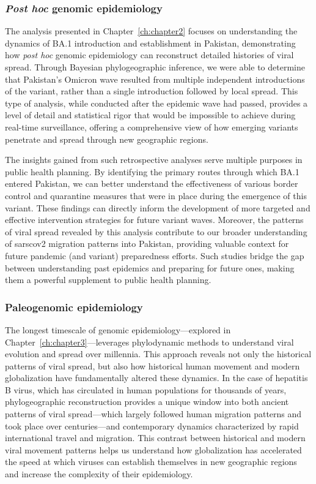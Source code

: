 \subsubsection{\textit{Post hoc} genomic epidemiology}
The analysis presented in Chapter~\ref{ch:chapter2} focuses on understanding the dynamics of BA.1 introduction and establishment in Pakistan, demonstrating how \textit{post hoc} genomic epidemiology can reconstruct detailed histories of viral spread.
Through Bayesian phylogeographic inference, we were able to determine that Pakistan's Omicron wave resulted from multiple independent introductions of the variant, rather than a single introduction followed by local spread.
This type of analysis, while conducted after the epidemic wave had passed, provides a level of detail and statistical rigor that would be impossible to achieve during real-time surveillance, offering a comprehensive view of how emerging variants penetrate and spread through new geographic regions.

The insights gained from such retrospective analyses serve multiple purposes in public health planning.
By identifying the primary routes through which BA.1 entered Pakistan, we can better understand the effectiveness of various border control and quarantine measures that were in place during the emergence of this variant.
These findings can directly inform the development of more targeted and effective intervention strategies for future variant waves.
Moreover, the patterns of viral spread revealed by this analysis contribute to our broader understanding of \gls{sarscov2} migration patterns into Pakistan, providing valuable context for future pandemic (and variant) preparedness efforts.
Such studies bridge the gap between understanding past epidemics and preparing for future ones, making them a powerful supplement to public health planning.

\subsubsection{Paleogenomic epidemiology}
The longest timescale of genomic epidemiology---explored in Chapter~\ref{ch:chapter3}---leverages phylodynamic methods to understand viral evolution and spread over millennia.
This approach reveals not only the historical patterns of viral spread, but also how historical human movement and modern globalization have fundamentally altered these dynamics.
In the case of hepatitis B virus, which has circulated in human populations for thousands of years, phylogeographic reconstruction provides a unique window into both ancient patterns of viral spread---which largely followed human migration patterns and took place over centuries---and contemporary dynamics characterized by rapid international travel and migration.
This contrast between historical and modern viral movement patterns helps us understand how globalization has accelerated the speed at which viruses can establish themselves in new geographic regions and increase the complexity of their epidemiology.

